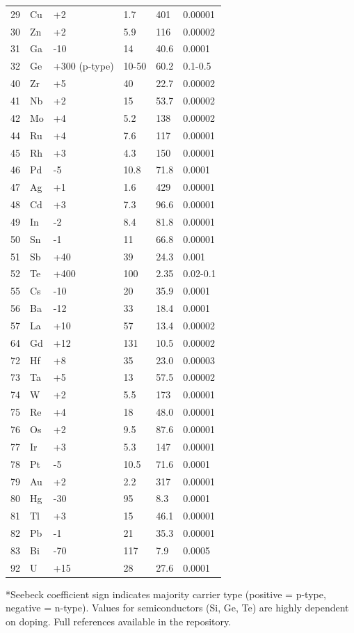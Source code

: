 \documentclass[12pt,a4paper]{article}
\begin{document}
\begin{longtable}{p{0.8cm}p{1.2cm}p{2.2cm}p{2.2cm}p{2.2cm}p{2.2cm}}
		29 & Cu & +2 & 1.7 & 401 & 0.00001 \\
		30 & Zn & +2 & 5.9 & 116 & 0.00002 \\
		31 & Ga & -10 & 14 & 40.6 & 0.0001 \\
		32 & Ge & +300 (p-type) & 10-50 & 60.2 & 0.1-0.5 \\
		40 & Zr & +5 & 40 & 22.7 & 0.00002 \\
		41 & Nb & +2 & 15 & 53.7 & 0.00002 \\
		42 & Mo & +4 & 5.2 & 138 & 0.00002 \\
		44 & Ru & +4 & 7.6 & 117 & 0.00001 \\
		45 & Rh & +3 & 4.3 & 150 & 0.00001 \\
		46 & Pd & -5 & 10.8 & 71.8 & 0.0001 \\
		47 & Ag & +1 & 1.6 & 429 & 0.00001 \\
		48 & Cd & +3 & 7.3 & 96.6 & 0.00001 \\
		49 & In & -2 & 8.4 & 81.8 & 0.00001 \\
		50 & Sn & -1 & 11 & 66.8 & 0.00001 \\
		51 & Sb & +40 & 39 & 24.3 & 0.001 \\
		52 & Te & +400 & 100 & 2.35 & 0.02-0.1 \\
		55 & Cs & -10 & 20 & 35.9 & 0.0001 \\
		56 & Ba & -12 & 33 & 18.4 & 0.0001 \\
		57 & La & +10 & 57 & 13.4 & 0.00002 \\
		64 & Gd & +12 & 131 & 10.5 & 0.00002 \\
		72 & Hf & +8 & 35 & 23.0 & 0.00003 \\
		73 & Ta & +5 & 13 & 57.5 & 0.00002 \\
		74 & W  & +2 & 5.5 & 173 & 0.00001 \\
		75 & Re & +4 & 18 & 48.0 & 0.00001 \\
		76 & Os & +2 & 9.5 & 87.6 & 0.00001 \\
		77 & Ir & +3 & 5.3 & 147 & 0.00001 \\
		78 & Pt & -5 & 10.5 & 71.6 & 0.0001 \\
		79 & Au & +2 & 2.2 & 317 & 0.00001 \\
		80 & Hg & -30 & 95 & 8.3 & 0.0001 \\
		81 & Tl & +3 & 15 & 46.1 & 0.00001 \\
		82 & Pb & -1 & 21 & 35.3 & 0.00001 \\
		83 & Bi & -70 & 117 & 7.9 & 0.0005 \\
		92 & U  & +15 & 28 & 27.6 & 0.0001 \\
		\bottomrule
	\end{longtable}
	*Seebeck coefficient sign indicates majority carrier type (positive = p-type, negative = n-type). Values for semiconductors (Si, Ge, Te) are highly dependent on doping. Full references available in the repository.
	
\end{document}
